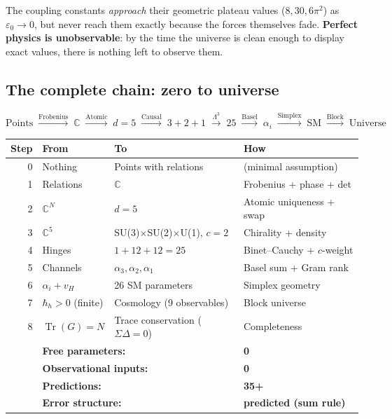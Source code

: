 \documentclass[12pt]{article}
\theoremstyle{remark}
\theoremstyle{definition}
\newcommand{\CC}{\mathbb{C}}
\newcommand{\tr}{\operatorname{Tr}}
\begin{document}
The coupling constants \emph{approach} their geometric plateau values ($8, 30, 6\pi^2$) as $\varepsilon_0 \to 0$, but never reach them exactly because the forces themselves fade. \textbf{Perfect physics is unobservable}: by the time the universe is clean enough to display exact values, there is nothing left to observe them.

\subsection{The complete chain: zero to universe}

\begin{equation}
\boxed{
\text{Points} \;\xrightarrow{\text{Frobenius}}\; \CC
\;\xrightarrow{\text{Atomic}}\; d = 5
\;\xrightarrow{\text{Causal}}\; 3\!+\!2\!+\!1
\;\xrightarrow{\Lambda^3}\; 25
\;\xrightarrow{\text{Basel}}\; \alpha_i
\;\xrightarrow{\text{Simplex}}\; \text{SM}
\;\xrightarrow{\text{Block}}\; \text{Universe}
}
\end{equation}

\begin{center}
\begin{tabular}{rlll}
\hline
Step & From & To & How \\
\hline
0 & Nothing & Points with relations & (minimal assumption) \\
1 & Relations & $\CC$ & Frobenius + phase + det \\
2 & $\CC^N$ & $d = 5$ & Atomic uniqueness + swap \\
3 & $\CC^5$ & SU(3)$\times$SU(2)$\times$U(1), $c\!=\!2$ & Chirality + density \\
4 & Hinges & $1 + 12 + 12 = 25$ & Binet--Cauchy + $c$-weight \\
5 & Channels & $\alpha_3, \alpha_2, \alpha_1$ & Basel sum + Gram rank \\
6 & $\alpha_i + v_H$ & 26 SM parameters & Simplex geometry \\
7 & $\hbar_h > 0$ (finite) & Cosmology (9 observables) & Block universe \\
8 & $\tr(G) = N$ & Trace conservation ($\Sigma\Delta = 0$) & Completeness \\
\hline
& \multicolumn{2}{l}{\textbf{Free parameters:}} & \textbf{0} \\
& \multicolumn{2}{l}{\textbf{Observational inputs:}} & \textbf{0} \\
& \multicolumn{2}{l}{\textbf{Predictions:}} & \textbf{35+} \\
& \multicolumn{2}{l}{\textbf{Error structure:}} & \textbf{predicted (sum rule)} \\
\hline
\end{tabular}
\end{center}
\end{document}

